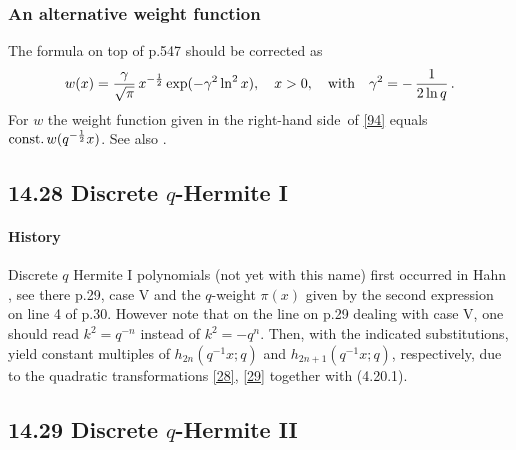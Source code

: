 \documentclass[twoside,11pt]{article}
\newcommand\ga\gamma
\newcommand\half{\frac12}
\newcommand\const{{\rm const.}\,}
\newcommand\RHS{right-hand side}
\begin{document}
\subsubsection*{An alternative weight function}
The formula on top of p.547 should be corrected as
\begin{equation}
w(x)=\frac\ga{\sqrt\pi}\,x^{-\half}\exp(-\ga^2\ln^2 x),\quad x>0,\quad
{\rm with}\quad\ga^2=-\,\frac1{2\ln q}\,.
\label{94}
\end{equation}
For $w$ the weight function given in  the \RHS\ of \eqref{94}
equals $\const w(q^{-\half}x)$. See also
.
%
\subsection*{14.28 Discrete $q$-Hermite I}
\label{sec14.28}
%
\paragraph{History}
Discrete $q$ Hermite I polynomials (not yet with this name) first occurred in
Hahn , see there p.29, case V and the $q$-weight $\pi(x)$ given by
the second expression on line 4 of p.30. However note that on the line on p.29 dealing with
case V, one should read $k^2=q^{-n}$ instead of $k^2=-q^n$. Then, with the indicated
substitutions,   yield constant multiples of
$h_{2n}(q^{-1}x;q)$ and $h_{2n+1}(q^{-1}x;q)$, respectively,
 due to the quadratic transformations \eqref{28}, \eqref{29} together with  (4.20.1).
%
\subsection*{14.29 Discrete $q$-Hermite II}
\label{sec14.29}
%
\end{document}
